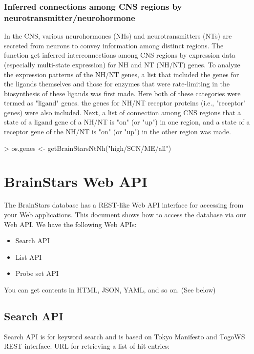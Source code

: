\documentclass[12pt,fullpage]{article}
\begin{document}
\subsubsection{Inferred connections among CNS regions by neurotransmitter/neurohormone}
In the CNS, various neurohormones (NHs) and neurotransmitters (NTs) are secreted from neurons to convey information among distinct regions. The function get inferred interconnections among CNS regions by expression data (especially multi-state expression) for NH and NT (NH/NT) genes. To analyze the expression patterns of the NH/NT genes, a list that included the genes for the ligands themselves and those for enzymes that were rate-limiting in the biosynthesis of these ligands was first made. Here both of these categories were termed as "ligand" genes. the genes for NH/NT receptor proteins (i.e., "receptor" genes) were also included. Next, a list of connection among CNS regions that a state of a ligand gene of a NH/NT is "on" (or "up") in one region, and a state of a receptor gene of the NH/NT is "on" (or "up") in the other region was made.
\begin{Schunk}
\begin{Sinput}
> os.genes <- getBrainStarsNtNh("high/SCN/ME/all")
\end{Sinput}
\end{Schunk}

\section{BrainStars Web API} 
The BrainStars database has a REST-like Web API interface for accessing from your Web applications. This document shows how to access the database via our Web API. We have the following Web APIs:

\begin{itemize}
  \item Search API
  \item List API
  \item Probe set API
\end{itemize}

You can get contents in HTML, JSON, YAML, and so on. (See below)

\subsection{Search API}
Search API is for keyword search and is based on Tokyo Manifesto and TogoWS REST interface. URL for retrieving a list of hit entries:
\end{document}
